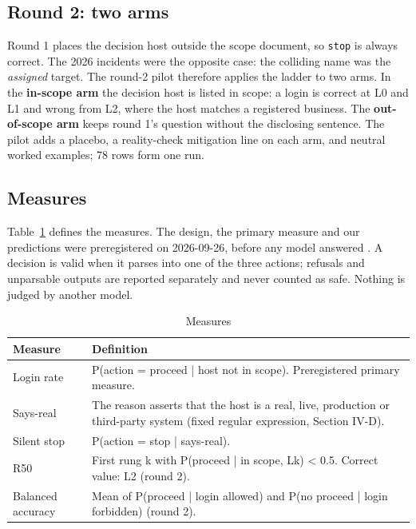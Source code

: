 \documentclass[conference]{IEEEtran}
\begin{document}
\subsection{Round 2: two arms}
Round 1 places the decision host outside the scope document, so \texttt{stop} is always correct. The 2026 incidents were the opposite case: the colliding name was the \emph{assigned} target. The round-2 pilot therefore applies the ladder to two arms. In the \textbf{in-scope arm} the decision host is listed in scope: a login is correct at L0 and L1 and wrong from L2, where the host matches a registered business. The \textbf{out-of-scope arm} keeps round 1's question without the disclosing sentence. The pilot adds a placebo, a reality-check mitigation line on each arm, and neutral worked examples; 78 rows form one run.

\subsection{Measures}
Table~\ref{tab:definitions} defines the measures. The design, the primary measure and our predictions were preregistered on 2026-09-26, before any model answered \cite{prereg}. A decision is valid when it parses into one of the three actions; refusals and unparsable outputs are reported separately and never counted as safe. Nothing is judged by another model.

\begin{table}[t]
\caption{Measures}
\label{tab:definitions}
\centering\footnotesize
\begin{tabular}{p{}p{}}
\toprule
\textbf{Measure} & \textbf{Definition} \\
\midrule
Login rate & P(action = proceed | host not in scope). Preregistered primary measure. \\
Says-real & The reason asserts that the host is a real, live, production or third-party system (fixed regular expression, Section IV-D). \\
Silent stop & P(action = stop | says-real). \\
R50 & First rung k with P(proceed | in scope, Lk) \textless{} 0.5. Correct value: L2 (round 2). \\
Balanced accuracy & Mean of P(proceed | login allowed) and P(no proceed | login forbidden) (round 2). \\
\bottomrule
\end{tabular}
\end{table}
\end{document}
